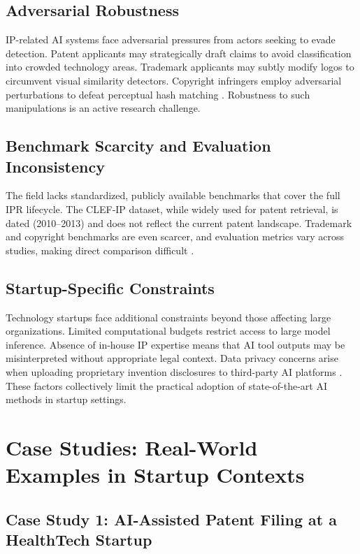 \documentclass[conference]{IEEEtran}
\begin{document}
\subsection{Adversarial Robustness}

IP-related AI systems face adversarial pressures from actors seeking to evade detection. Patent applicants may strategically draft claims to avoid classification into crowded technology areas. Trademark applicants may subtly modify logos to circumvent visual similarity detectors. Copyright infringers employ adversarial perturbations to defeat perceptual hash matching \cite{ref33}. Robustness to such manipulations is an active research challenge.

\subsection{Benchmark Scarcity and Evaluation Inconsistency}

The field lacks standardized, publicly available benchmarks that cover the full IPR lifecycle. The CLEF-IP dataset, while widely used for patent retrieval, is dated (2010--2013) and does not reflect the current patent landscape. Trademark and copyright benchmarks are even scarcer, and evaluation metrics vary across studies, making direct comparison difficult \cite{ref15}.

\subsection{Startup-Specific Constraints}

Technology startups face additional constraints beyond those affecting large organizations. Limited computational budgets restrict access to large model inference. Absence of in-house IP expertise means that AI tool outputs may be misinterpreted without appropriate legal context. Data privacy concerns arise when uploading proprietary invention disclosures to third-party AI platforms \cite{ref2}. These factors collectively limit the practical adoption of state-of-the-art AI methods in startup settings.

\section{Case Studies: Real-World Examples in Startup Contexts}

\subsection{Case Study 1: AI-Assisted Patent Filing at a HealthTech Startup}
\end{document}
